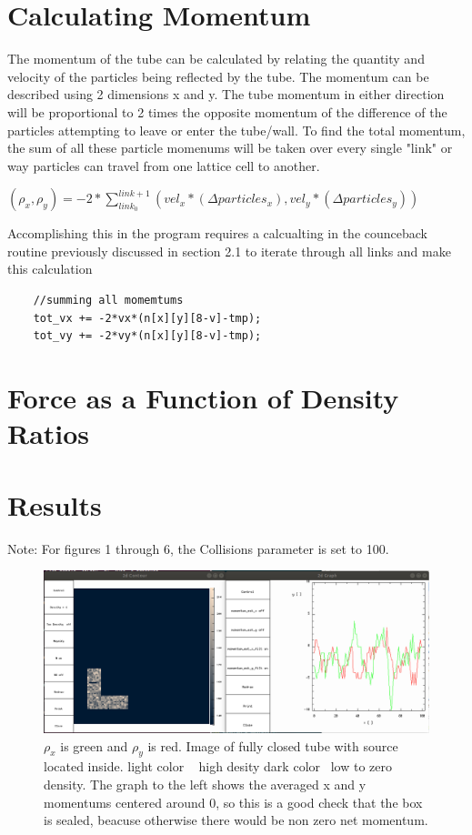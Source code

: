 \documentclass{article}
\begin{document}
\section{Calculating Momentum}
 The momentum of the tube can be calculated by relating  the quantity and velocity of the particles being reflected by the tube. The momentum can be described using 2 dimensions x and y. The tube momentum in either direction will be proportional to 2 times the opposite momentum of the difference of the particles attempting to leave or enter the tube/wall. To find the total momentum, the sum of all these particle momenums will be taken over every single "link" or way particles can travel from one lattice cell to another.
 
\vspace{5mm}
$
(\rho_x,\rho_y) = -2*\sum_{link_0}^{link+1} (vel_x*(\Delta particles_x),vel_y*(\Delta particles_y))
 $
\vspace{5mm}

 Accomplishing this in the program requires a calcualting in the counceback routine previously discussed in section 2.1 to iterate through all links and make this calculation
 
 \begin{verbatim}
    //summing all momemtums
    tot_vx += -2*vx*(n[x][y][8-v]-tmp);
    tot_vy += -2*vy*(n[x][y][8-v]-tmp);
\end{verbatim}
 
\section{Force as a Function of Density Ratios}

\section{Results}
\vspace{5mm}
Note: For figures 1 through 6, the Collisions parameter is set to 100.
\vspace{5mm}
\begin{figure}[H]
\centering
\includegraphics[scale=0.3]{p1_noleakage.png}
\caption{\label{fig} $\rho_x$ is green and $\rho_y$ is red. Image of fully closed tube with source located inside. light color ~ high desity dark color ~low to zero density. The graph to the left shows the averaged x and y momentums centered around 0, so this is a good check that the box is sealed, beacuse otherwise there would be non zero net momentum.}
\end{figure}
\end{document}
